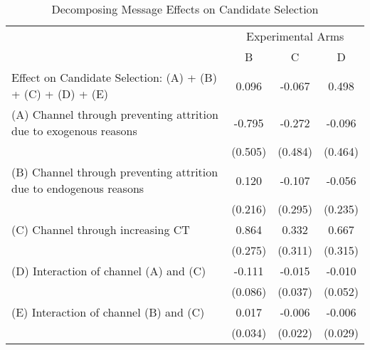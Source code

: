\documentclass[12pt, a4paper]{article}
\begin{document}
\begin{table}[H]

\caption{\label{tab:decompose-candidate}Decomposing Message Effects on Candidate Selection}
\centering
\fontsize{8}{10}\selectfont
\begin{threeparttable}
\begin{tabular}[t]{lccc}
\toprule
\multicolumn{1}{c}{ } & \multicolumn{3}{c}{Experimental Arms} \\
\cmidrule(l{3pt}r{3pt}){2-4}
 & B & C & D\\
\midrule
Effect on Candidate Selection: (A) + (B) + (C) + (D) + (E) & 0.096 & -0.067 & 0.498\\
(A) Channel through preventing attrition due to exogenous reasons & -0.795 & -0.272 & -0.096\\
 & (0.505) & (0.484) & (0.464)\\
(B) Channel through preventing attrition due to endogenous reasons & 0.120 & -0.107 & -0.056\\
 & (0.216) & (0.295) & (0.235)\\
(C) Channel through increasing CT & 0.864 & 0.332 & 0.667\\
 & (0.275) & (0.311) & (0.315)\\
(D) Interaction of channel (A) and (C) & -0.111 & -0.015 & -0.010\\
 & (0.086) & (0.037) & (0.052)\\
(E) Interaction of channel (B) and (C) & 0.017 & -0.006 & -0.006\\
 & (0.034) & (0.022) & (0.029)\\
\bottomrule
\end{tabular}
\begin{tablenotes}
\item 
\end{tablenotes}
\end{threeparttable}
\end{table}

\clearpage


\end{document}
